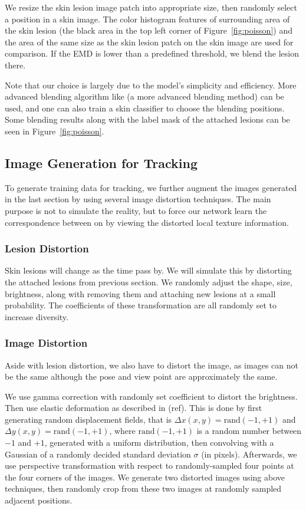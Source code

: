 \documentclass[letterpaper]{article}
\begin{document}
We resize the skin lesion image patch into appropriate size, then randomly select a position in a skin image. The color histogram features of surrounding area of the skin lesion (the black area in the top left corner of Figure~\ref{fig:poisson}) and the area of the same size as the skin lesion patch on the skin image are used for comparison. If the EMD is lower than a predefined threshold, we blend the lesion there.

Note that our choice is largely due to the model's simplicity and efficiency. More advanced blending algorithm like (a more advanced blending method) can be used, and one can also train a skin classifier to choose the blending positions. Some blending results along with the label mask of the attached lesions can be seen in Figure~\ref{fig:poisson}.

\subsection{Image Generation for Tracking}

To generate training data for tracking, we further augment the images generated in the last section by using several image distortion techniques. The main purpose is not to simulate the reality, but to force our network learn the correspondence between on by viewing the distorted local texture information.

\subsubsection{Lesion Distortion}

Skin lesions will change as the time pass by. We will simulate this by distorting the attached lesions from previous section. We randomly adjust the shape, size, brightness, along with removing them and attaching new lesions at a small probability. The coefficients of these transformation are all randomly set to increase diversity.

\subsubsection{Image Distortion}

Aside with lesion distortion, we also have to distort the image, as images can not be the same although the pose and view point are approximately the same. 

We use gamma correction with randomly set coefficient to distort the brightness. Then use elastic deformation as described in (ref). This is done by first generating random displacement fields, that is $\Delta x(x, y) = \text{rand}(-1, +1)$ and $\Delta y(x, y) = \text{rand}(-1, +1)$, where $\text{rand}(-1, +1)$ is a random number between $-1$ and $+1$, generated with a uniform distribution, then convolving with a Gaussian of a randomly decided standard deviation $\sigma$ (in pixels). Afterwards, we use perspective transformation with respect to randomly-sampled four points at the four corners of the images. We generate two distorted images using above techniques, then randomly crop from these two images at randomly sampled adjacent positions.
\end{document}
